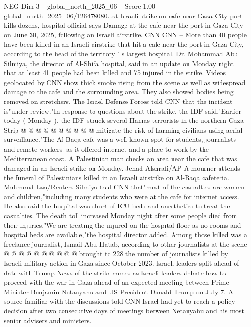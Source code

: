 \begin{textsample}{NEG Dim 3 – global\_north\_2025\_06 – Score 1.00 – global\_north\_2025\_06/126478080.txt}  \label{ex:f3_neg_362}
Israeli strike on cafe near Gaza City port kills dozens, hospital official says Damage at the cafe near the port in Gaza City on June 30, 2025, following an Israeli airstrike.
CNN CNN -- More than 40 people have been killed in an Israeli airstrike that hit a cafe near the port in Gaza City, according to the head of the territory ' s largest hospital.
Dr.
Mohammad Abu Silmiya, the director of Al-Shifa hospital, said in an update on Monday night that at least 41 people had been killed and 75 injured in the strike.
Videos geolocated by CNN show thick smoke rising from the scene as well as widespread damage to the cafe and the surrounding area.
They also showed bodies being removed on stretchers.
The Israel Defense Forces told CNN that the incident is"under review."In response to questions about the strike, the IDF said,"Earlier today ( Monday ), the IDF struck several Hamas terrorists in the northern Gaza Strip @ @ @ @ @ @ @ @ @ @ mitigate the risk of harming civilians using aerial surveillance."The Al-Baqa cafe was a well-known spot for students, journalists and remote workers, as it offered internet and a place to work by the Mediterranean coast.
A Palestinian man checks an area near the cafe that was damaged in an Israeli strike on Monday.
Jehad Alshrafi/AP A mourner attends the funeral of Palestinians killed in an Israeli airstrike on Al-Baqa cafeteria.
Mahmoud Issa/Reuters Silmiya told CNN that"most of the casualties are women and children,"including many students who were at the cafe for internet access.
He also said the hospital was short of ICU beds and anesthetics to treat the casualties.
The death toll increased Monday night after some people died from their injuries."We are treating the injured on the hospital floor as no rooms and hospital beds are available,"the hospital director added.
Among those killed was a freelance journalist, Ismail Abu Hatab, according to other journalists at the scene @ @ @ @ @ @ @ @ @ @ brought to 228 the number of journalists killed by Israeli military action in Gaza since October 2023.
Israeli leaders split ahead of date with Trump News of the strike comes as Israeli leaders debate how to proceed with the war in Gaza ahead of an expected meeting between Prime Minister Benjamin Netanyahu and US President Donald Trump on July 7.
A source familiar with the discussions told CNN Israel had yet to reach a policy decision after two consecutive days of meetings between Netanyahu and his most senior advisers and ministers.

\end{textsample}
